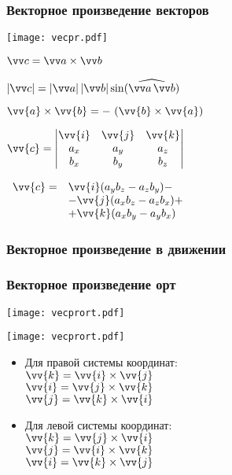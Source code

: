 \documentclass[10pt]{beamer}
\begin{document}
\begin{frame}\frametitle{Векторное произведение векторов}
{
	{
		\texttt{[image: vecpr.pdf]}
		
		
	}
	{
		$\VV{c} = \VV{a} \times \VV{b} $
		
		$\ABS{\VV{c}} = \ABS{\VV{a}}\ABS{\VV{b}}\sin( \widehat{\VV{a}\, \VV{b}} ) $
		
		{\Strut$ \vv{a} \times \vv{b} = -\,\left(\vv{b} \times \vv{a} \right)$}
		
		\hfill	
		
		$\vv{c} = \begin{vmatrix}
			\vv{i} & \vv{j} & \vv{k} \\
			a_x & a_y & a_z          \\
			b_x & b_y & b_z          \\
		\end{vmatrix}$	
		
		
		\hfill
		
	
		
		\hfill
		
		
		$\begin{array}{rl}
			\vv{c} = & \vv{i}(a_yb_z-a_zb_y) - \\
			& - \vv{j}(a_xb_z-a_zb_x) + \\
			& + \vv{k}({a_xb_y-a_yb_x})
		\end{array}   $
	}
	
}
\end{frame}


	\begin{frame}\frametitle{Векторное произведение в движении}
	{
		
		
		
		
	}
	\end{frame}


\begin{frame}\frametitle {Векторное произведение орт}
{
	{
		\texttt{[image: vecprort.pdf]}
		
		\texttt{[image: vecprort.pdf]}
	}
	{
		\begin{itemize}
			\item {Для правой системы координат: \\
			$\vv{k}=\vv{i}\times\vv{j}$ \\
			$\vv{i}=\vv{j}\times\vv{k}$ \\
			$\vv{j}=\vv{k}\times\vv{i}$}
			\item {Для левой системы координат: \\
			$\vv{k}=\vv{j}\times\vv{i}$\\
			$\vv{j}=\vv{i}\times\vv{k}$\\
			$\vv{i}=\vv{k}\times\vv{j}$\\}
		\end{itemize}
	}
}
\end{frame}
\end{document}
